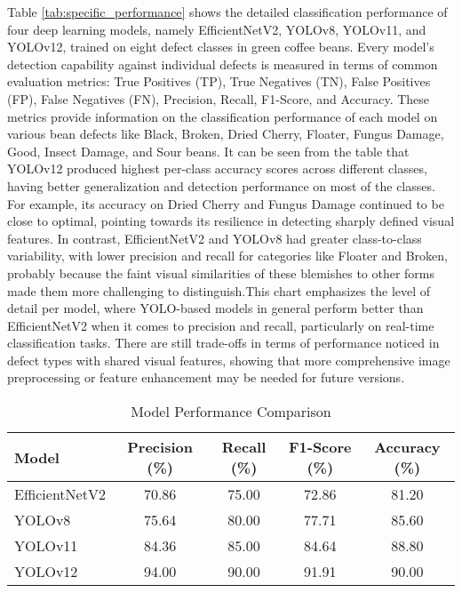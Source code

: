 Table \ref{tab:specific_performance} shows the detailed classification performance of four deep learning models, namely EfficientNetV2, YOLOv8, YOLOv11, and YOLOv12, trained on eight defect classes in green coffee beans. Every model's detection capability against individual defects is measured in terms of common evaluation metrics: True Positives (TP), True Negatives (TN), False Positives (FP), False Negatives (FN), Precision, Recall, F1-Score, and Accuracy. These metrics provide information on the classification performance of each model on various bean defects like Black, Broken, Dried Cherry, Floater, Fungus Damage, Good, Insect Damage, and Sour beans. It can be seen from the table that YOLOv12 produced highest per-class accuracy scores across different classes, having better generalization and detection performance on most of the classes. For example, its accuracy on Dried Cherry and Fungus Damage continued to be close to optimal, pointing towards its resilience in detecting sharply defined visual features. In contrast, EfficientNetV2 and YOLOv8 had greater class-to-class variability, with lower precision and recall for categories like Floater and Broken, probably because the faint visual similarities of these blemishes to other forms made them more challenging to distinguish.This chart emphasizes the level of detail per model, where YOLO-based models in general perform better than EfficientNetV2 when it comes to precision and recall, particularly on real-time classification tasks. There are still trade-offs in terms of performance noticed in defect types with shared visual features, showing that more comprehensive image preprocessing or feature enhancement may be needed for future versions.

\begin{table}[ht]
	\centering
	\caption{Model Performance Comparison}
	\label{tab:model_performance}
	\begin{tabular}{l c c c c}
	\toprule
	\textbf{Model} & \textbf{Precision (\%)} & \textbf{Recall (\%)} & \textbf{F1-Score (\%)} & \textbf{Accuracy (\%)} \\
	\midrule
	EfficientNetV2 & 70.86 & 75.00 & 72.86 & 81.20 \\
	YOLOv8        & 75.64 & 80.00 & 77.71 & 85.60 \\
	YOLOv11       & 84.36 & 85.00 & 84.64 & 88.80 \\
	YOLOv12       & 94.00 & 90.00 & 91.91 & 90.00 \\
	\bottomrule
	\end{tabular}
\end{table}


